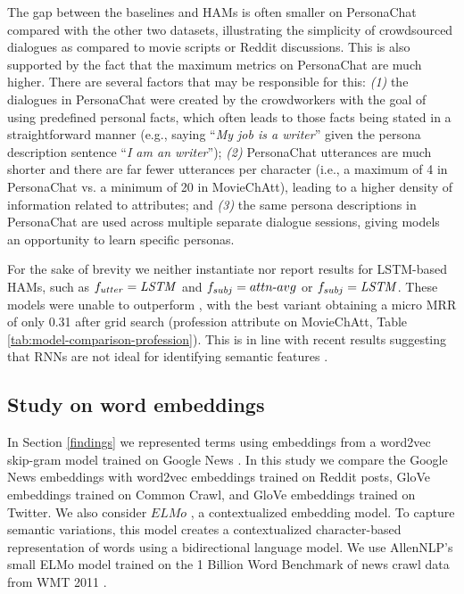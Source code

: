The gap between the baselines and HAMs is often smaller on PersonaChat compared with the other two datasets, illustrating the simplicity of crowdsourced dialogues as compared to movie scripts or Reddit discussions. This is also supported by the fact that the maximum metrics on PersonaChat are much higher. There are several factors that may be responsible for this: \textit{(1)} the dialogues in PersonaChat were created by the crowdworkers with the goal of using predefined personal facts, which often leads to those facts being stated in a straightforward manner (e.g., saying ``\textit{My job is a writer}'' given the persona description sentence ``\textit{I am an writer}''); \textit{(2)} PersonaChat utterances are much shorter 
and there are far fewer utterances per character (i.e., a maximum of 4 in PersonaChat vs. a minimum of 20 in MovieChAtt), leading to a higher density of information related to attributes; and \textit{(3)} the same persona descriptions in PersonaChat are used across multiple separate dialogue sessions, giving models an opportunity to learn specific personas.

For the sake of brevity we neither instantiate nor report results for LSTM-based HAMs, such as $f_{utter}=\text{\textit{LSTM}}$ and $f_{subj}=attn{\text -}avg$ or $f_{subj}=\text{\textit{LSTM}}$. These models were unable to outperform , with the best variant obtaining a micro MRR of only 0.31 after grid search (profession attribute on MovieChAtt, Table \ref{tab:model-comparison-profession}). This is in line with recent results suggesting that RNNs are not ideal for identifying semantic features \cite{tang2018self}.



\subsection{Study on word embeddings}
In Section \ref{findings} we represented terms using embeddings from a word2vec skip-gram model trained on Google News \cite{embed1}.
In this study we compare the Google News embeddings with word2vec embeddings trained on Reddit posts, \gls{GloVe} \cite{pennington2014glove} embeddings trained on Common Crawl, and GloVe embeddings trained on Twitter. We also consider $ELMo$ \cite{Peters:2018}, a contextualized embedding model. To capture semantic variations, this model creates a contextualized character-based representation of words using a bidirectional language model. We use AllenNLP's small \gls{ELMo model} trained on the 1 Billion Word Benchmark of news crawl data from WMT 2011 \cite{41880}. 

